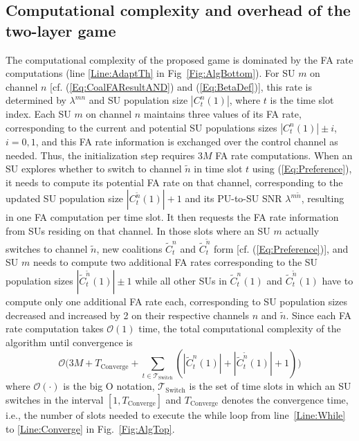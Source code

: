 \documentclass[journal,draftclsnofoot,onecolumn]{IEEEtran}
\theoremstyle{definition}
\begin{document}
\subsection{Computational complexity and overhead of the two-layer game}\label{SubSec:Complexity}
The computational complexity of the proposed game is dominated by the FA rate computations (line \ref{Line:AdaptTh} in Fig~\ref{Fig:AlgBottom}). For SU $m$ on channel $n$ [cf. (\ref{Eq:CoalFAResultAND}) and (\ref{Eq:BetaDef})], this rate is determined by $\lambda^{mn}$ and SU population size $|C_t^n(1)|$, where $t$ is the time slot index. Each SU $m$ on channel $n$ maintains three values of its FA rate, corresponding to the current and potential SU populations sizes $|C_t^n(1)|\pm i$, $i=0,1$, and this FA rate information is exchanged over the control channel as needed. Thus, the initialization step requires $3M$ FA rate computations. When an SU explores whether to switch to channel $\tilde{n}$ in time slot $t$ using (\ref{Eq:Preference}), it needs to compute its potential FA rate on that channel, corresponding to the updated SU population size $|C_t^{\tilde{n}}(1)|+1$ and its PU-to-SU SNR $\lambda^{m\tilde{n}}$, resulting in one FA computation per time slot. It then requests the FA rate information from SUs residing on that channel. In those slots where an SU $m$ actually switches to channel $\tilde{n}$, new coalitions $\tilde{C}_t^n$ and $\tilde{C}_t^{\tilde{n}}$ form [cf. (\ref{Eq:Preference})], and SU $m$ needs to compute two additional FA rates corresponding to the SU population sizes $|\tilde{C}_t^{\tilde{n}}(1)|\pm 1$ while all other SUs in $\tilde{C}_t^n(1)$ and $\tilde{C}_t^{\tilde{n}}(1)$ have to compute only one additional FA rate each, corresponding to SU population sizes decreased and increased by 2 on their respective channels $n$ and $\tilde{n}$. Since each FA rate computation takes $\mathcal{O}(1)$ time, the total computational complexity of the algorithm until convergence is
\begin{equation}
\mathcal{O}\Big(3M+T_\textrm{Converge}+\!\sum_{t\in\mathcal{T}_\textrm{Switch}}(|\tilde{C}_t^n(1)|+|\tilde{C}_t^{\tilde{n}}(1)|+1)\Big )
\label{Eq:Complexity}
\end{equation}
where $\mathcal{O}(\cdot)$ is the big O notation\cite{CLRS}, $\mathcal{T}_\textrm{Switch}$ is the set of time slots in which an SU switches in the interval $[1,T_\textrm{Converge}]$ and $T_\textrm{Converge}$ denotes the convergence time, i.e., the number of slots needed to execute the while loop from line~\ref{Line:While} to \ref{Line:Converge} in Fig.~\ref{Fig:AlgTop}.
\end{document}
